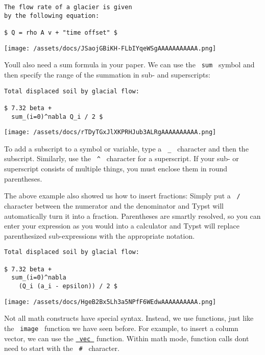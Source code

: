 \begin{verbatim}
The flow rate of a glacier is given
by the following equation:

$ Q = rho A v + "time offset" $
\end{verbatim}

\texttt{[image: /assets/docs/JSaojGBiKH-FLbIYqeWSgAAAAAAAAAAA.png]}

You\textquotesingle ll also need a sum formula in your paper. We can use
the \texttt{\ sum\ } symbol and then specify the range of the summation
in sub- and superscripts:

\begin{verbatim}
Total displaced soil by glacial flow:

$ 7.32 beta +
  sum_(i=0)^nabla Q_i / 2 $
\end{verbatim}

\texttt{[image: /assets/docs/rTDyTGxJlXKPRHJub3ALRgAAAAAAAAAA.png]}

To add a subscript to a symbol or variable, type a \texttt{\ \_\ }
character and then the subscript. Similarly, use the \texttt{\ \^{}\ }
character for a superscript. If your sub- or superscript consists of
multiple things, you must enclose them in round parentheses.

The above example also showed us how to insert fractions: Simply put a
\texttt{\ /\ } character between the numerator and the denominator and
Typst will automatically turn it into a fraction. Parentheses are
smartly resolved, so you can enter your expression as you would into a
calculator and Typst will replace parenthesized sub-expressions with the
appropriate notation.

\begin{verbatim}
Total displaced soil by glacial flow:

$ 7.32 beta +
  sum_(i=0)^nabla
    (Q_i (a_i - epsilon)) / 2 $
\end{verbatim}

\texttt{[image: /assets/docs/HgeB2Bx5Lh3a5NPfF6WEdwAAAAAAAAAA.png]}

Not all math constructs have special syntax. Instead, we use functions,
just like the \texttt{\ image\ } function we have seen before. For
example, to insert a column vector, we can use the
\href{/docs/reference/math/vec/}{\texttt{\ vec\ }} function. Within math
mode, function calls don\textquotesingle t need to start with the
\texttt{\ \#\ } character.

